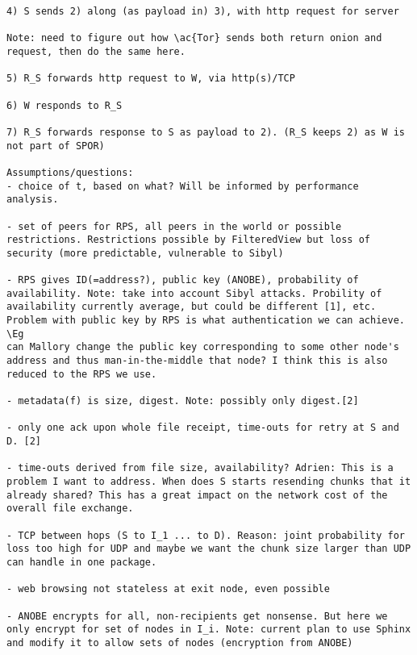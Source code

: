 \begin{verbatim}
4) S sends 2) along (as payload in) 3), with http request for server

Note: need to figure out how \ac{Tor} sends both return onion and request, then do the same here.

5) R_S forwards http request to W, via http(s)/TCP

6) W responds to R_S

7) R_S forwards response to S as payload to 2). (R_S keeps 2) as W is not part of SPOR) 

Assumptions/questions:
- choice of t, based on what? Will be informed by performance analysis.

- set of peers for RPS, all peers in the world or possible restrictions. Restrictions possible by FilteredView but loss of security (more predictable, vulnerable to Sibyl)

- RPS gives ID(=address?), public key (ANOBE), probability of availability. Note: take into account Sibyl attacks. Probility of availability currently average, but could be different [1], etc. Problem with public key by RPS is what authentication we can achieve. \Eg 
can Mallory change the public key corresponding to some other node's 
address and thus man-in-the-middle that node? I think this is also 
reduced to the RPS we use.

- metadata(f) is size, digest. Note: possibly only digest.[2]

- only one ack upon whole file receipt, time-outs for retry at S and D. [2]

- time-outs derived from file size, availability? Adrien: This is a problem I want to address. When does S starts resending chunks that it already shared? This has a great impact on the network cost of the overall file exchange.

- TCP between hops (S to I_1 ... to D). Reason: joint probability for loss too high for UDP and maybe we want the chunk size larger than UDP can handle in one package.

- web browsing not stateless at exit node, even possible

- ANOBE encrypts for all, non-recipients get nonsense. But here we only encrypt for set of nodes in I_i. Note: current plan to use Sphinx and modify it to allow sets of nodes (encryption from ANOBE)



\end{verbatim}
